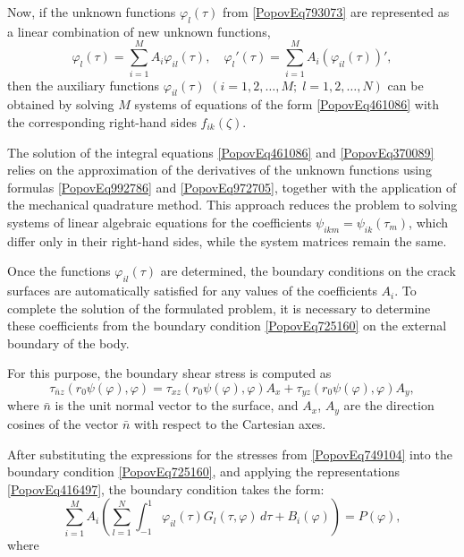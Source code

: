 Now, if the unknown functions \( \varphi_l(\tau) \) from \eqref{PopovEq793073} are represented as a linear combination of new unknown functions,
\begin{equation} \label{PopovEq416497} 
	\varphi_l(\tau) = \sum_{i=1}^{M} A_i \varphi_{il}(\tau), \quad 
	\varphi_l'(\tau) = \sum_{i=1}^{M} A_i \left(\varphi_{il}(\tau)\right)', 
\end{equation}
then the auxiliary functions \( \varphi_{il}(\tau) \) \((i=1,2,\dots,M;\; l=1,2,\dots,N)\) can be obtained by solving \( M \) systems of equations of the form \eqref{PopovEq461086} with the corresponding right-hand sides \( f_{ik}(\zeta) \). 

The solution of the integral equations \eqref{PopovEq461086} and \eqref{PopovEq370089} relies on the approximation of the derivatives of the unknown functions using formulas \eqref{PopovEq992786} and \eqref{PopovEq972705}, together with the application of the mechanical quadrature method. This approach reduces the problem to solving systems of linear algebraic equations for the coefficients \( \psi_{ikm} = \psi_{ik}(\tau_m) \), which differ only in their right-hand sides, while the system matrices remain the same.

Once the functions \( \varphi_{il}(\tau) \) are determined, the boundary conditions on the crack surfaces are automatically satisfied for any values of the coefficients \( A_i \). To complete the solution of the formulated problem, it is necessary to determine these coefficients from the boundary condition \eqref{PopovEq725160} on the external boundary of the body. 

For this purpose, the boundary shear stress is computed as
\begin{equation} \label{PopovEq749104} 
	\tau_{\bar{n}z}(r_0 \psi(\varphi), \varphi) = \tau_{xz}(r_0 \psi(\varphi), \varphi) A_x + \tau_{yz}(r_0 \psi(\varphi), \varphi) A_y,
\end{equation}
where \( \bar{n} \) is the unit normal vector to the surface, and \( A_x \), \( A_y \) are the direction cosines of the vector \( \bar{n} \) with respect to the Cartesian axes.

 After substituting the expressions for the stresses from \eqref{PopovEq749104} into the boundary condition \eqref{PopovEq725160}, and applying the representations \eqref{PopovEq416497}, the boundary condition takes the form:
\begin{equation} \label{PopovEq671340} 
	\sum_{i=1}^{M} A_i \left( \sum_{l=1}^{N} \int_{-1}^{1} \varphi_{il}(\tau) G_l(\tau, \varphi) \, d\tau + B_i(\varphi) \right) = P(\varphi),
\end{equation}
where

